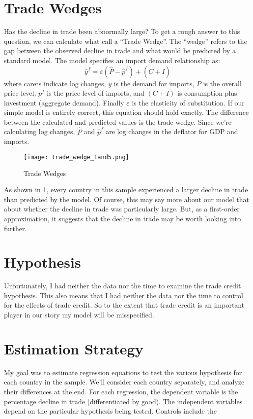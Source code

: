 \documentclass[11pt]{article}
\begin{document}
\section{Trade Wedges} %
\label{sec:trade_wedges}
  Has the decline in trade been abnormally large?  To get a rough answer to this question, we can calculate what \cite{llt:2010} call a ``Trade Wedge''.  The ``wedge'' refers to the gap between the observed decline in trade and what would be predicted by a standard model.  The model specifies an import demand relationship as:
  \begin{equation}
      \hat{y}^f = \varepsilon(\hat{P} - \hat{p}^f) + (\hat{C + I})
  \end{equation}
  where carets indicate log changes, $y$ is the demand for imports, $P$ is the overall price level, $p^f$ is the price level of imports, and $(C + I)$ is consumption plus investment (aggregate demand).  Finally $\varepsilon$ is the elasticity of substitution.  If our simple model is entirely correct, this equation should hold exactly.  The difference between the calculated and predicted values is the trade wedge.  Since we're calculating log changes, $\hat{P}$ and $\hat{p}^f$ are log changes in the deflator for GDP and imports.

  \begin{figure} \label{fig:trade_wedge}
    \centering
      \texttt{[image: trade\_wedge\_1and5.png]}
    \caption{Trade Wedges}
  \end{figure}

  As shown in \ref{fig:trade_wedge}, every country in this sample experienced a larger decline in trade than predicted by the model.  Of course, this may say more about our model that about whether the decline in trade was particularly large.  But, as a first-order approximation, it suggests that the decline in trade may be worth looking into further.

\section{Hypothesis}
\label{sec:hypothesis}
  Unfortunately, I had neither the data nor the time to examine the trade credit hypothesis.  This also means that I had neither the data nor the time to control for the effects of trade credit.  So to the extent that trade credit is an important player in our story my model will be misspecified.

\section{Estimation Strategy} %
\label{sec:estimation_strategy}
  My goal was to estimate regression equations to test the various hypothesis for each country in the sample.  We'll consider each country separately, and analyze their differences at the end.  For each regression, the dependent variable is the percentage decline in trade (differentiated by good).  The independent variables depend on the particular hypothesis being tested.  Controls include the 
\end{document}
